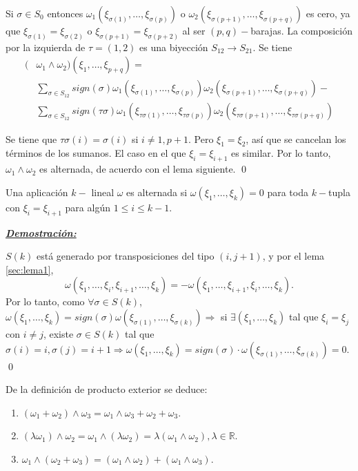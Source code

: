 Si $\sigma\in S_0$ entonces $\omega_1(\xi_{\sigma(1)},\dots,\xi_{\sigma(p)})$ o $\omega_2(\xi_{\sigma(p+1)},\dots,\xi_{\sigma(p+q)})$ es cero, ya que $\xi_{\sigma(1)}=\xi_{\sigma(2)}$ o $\xi_{\sigma(p+1)}=\xi_{\sigma(p+2)}$ al ser $(p,q)-$barajas.  La composición por la izquierda de $\tau=(1,2)$ es una biyección $S_{12}\rightarrow S_{21}$. Se tiene
\begin{equation}
  \begin{split}
(&\omega_1\wedge \omega_2)(\xi_1,\dots,\xi_{p+q})= \\
&\sum_{\sigma\in S_{12}}sign(\sigma) \omega_1(\xi_{\sigma(1)},\dots,\xi_{\sigma(p)})\omega_2(\xi_{\sigma(p+1)},\dots,\xi_{\sigma(p+q)}) - \\
&\sum_{\sigma\in S_{12}}sign(\tau \sigma)\omega_1(\xi_{\tau \sigma(1)},\dots,\xi_{\tau \sigma(p)})\omega_2(\xi_{\tau \sigma(p+1)},\dots,\xi_{\tau \sigma(p+q)})
\end{split}
\end{equation}

Se tiene que $\tau \sigma(i)=\sigma(i)$ si $i\neq 1,p+1$. Pero $\xi_1=\xi_2$, así que se cancelan los términos de los sumanos. El caso en el que $\xi_i=\xi_{i+1}$ es similar. Por lo tanto, $\omega_1\wedge\omega_2$ es alternada, de acuerdo con el lema siguiente. \qed

\begin{Lem}
\label{rec:lema4}
Una aplicación $k-$ lineal $\omega$ es alternada si $\omega(\xi_1,\dots,\xi_k)=0$ para toda $k-$tupla con $\xi_i=\xi_{i+1}$ para algún $1\le i\le k-1$. 
\end{Lem}

\underline{\textbf{\textit{Demostración:}}}

$S(k)$ está generado por transposiciones del tipo $(i,j+1)$, y por el lema \ref{sec:lema1},
$$\omega(\xi_1,\dots,\xi_i,\xi_{i+1},\dots,\xi_k)=-\omega (\xi_1,\dots,\xi_{i+1},\xi_i,\dots,\xi_k). $$
Por lo tanto, como $\forall \sigma\in S(k)$, $\omega(\xi_1,\dots,\xi_k)=sign(\sigma)\omega(\xi_{\sigma(1)},\dots,\xi_{\sigma(k)}) \Rightarrow $ si $\exists (\xi_1,\dots,\xi_k)$ tal que $\xi_i=\xi_j$ con $i\neq j$, existe $\sigma\in S(k)$ tal que $\sigma(i)=i,\sigma(j)=i+1 \Rightarrow \omega(\xi_1,\dots,\xi_k)=sign(\sigma)\cdot \omega (\xi_{\sigma(1)},\dots,\xi_{\sigma(k)})=0$. \qed


\vspace{3mm}
De la definición de producto exterior se deduce:
\begin{enumerate}
\item $(\omega_1+\omega_2)\wedge \omega_3=\omega_1\wedge \omega_3+\omega_2+\omega_3$.
\item $(\lambda \omega_1)\wedge \omega_2= \omega_1\wedge (\lambda \omega_2)=\lambda(\omega_1\wedge \omega_2), \lambda\in \mathbb{R}$.
\item $\omega_1\wedge (\omega_2+\omega_3)=(\omega_1\wedge \omega_2)+(\omega_1\wedge \omega_3)$. 
\end{enumerate}

